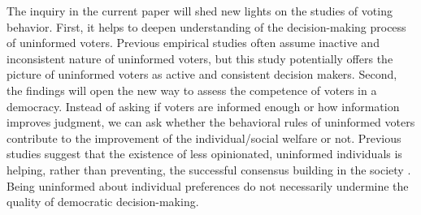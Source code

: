 \documentclass[doc,natbib,12pt]{apa6}\usepackage[]{graphicx}\usepackage[]{color}
\begin{document}
    
    
    
    \par The inquiry in the current paper will shed new lights on the studies of voting behavior. First, it helps to deepen understanding of the decision-making process of uninformed voters. Previous empirical studies often assume inactive and inconsistent nature of uninformed voters, but this study potentially offers the picture of uninformed voters as active and consistent decision makers. Second, the findings will open the new way to assess the competence of voters in a democracy. Instead of asking if voters are informed enough or how information improves judgment, we can ask whether the behavioral rules of uninformed voters contribute to the improvement of the individual/social welfare or not. Previous studies suggest that the existence of less opinionated, uninformed individuals is helping, rather than preventing, the successful consensus building in the society \citep{Couzin2011unin}. Being uninformed about individual preferences do not necessarily undermine the quality of democratic decision-making.
    
\end{document}

